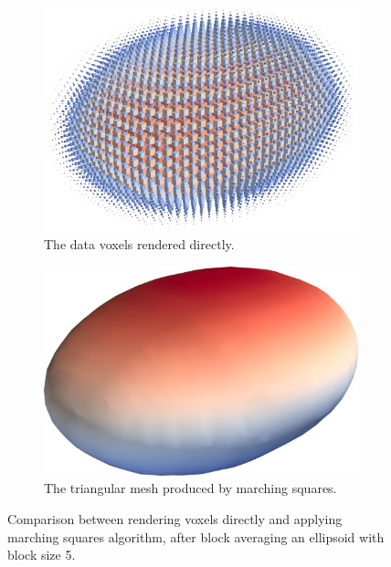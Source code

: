 \documentclass[a4paper,10pt]{report}
\begin{document}
\begin{figure}[H]
    \centering
    \begin{subfigure}{.49\textwidth}
        \includegraphics[width=\textwidth]{../images/3D/Ellipsoid_blocks_block_avg_5.png}
    \caption{The data voxels rendered directly.}
    \label{fig:Ellipsoid_blocks_block_avg_5}
    \end{subfigure}
    \hfill
    \begin{subfigure}{.49\textwidth}
        \includegraphics[width=\textwidth]{../images/3D/Ellipsoid_marching_squares_block_avg_5.png}
    \caption{The triangular mesh produced by marching squares.}
    \label{fig:Ellipsoid_marching_squares_block_avg_5}
    \end{subfigure}
    \caption{Comparison between rendering voxels directly and applying marching squares algorithm, after block averaging an ellipsoid with block size 5.}
    \label{fig:Ellipsoid_block_avg_5}
\end{figure}
\end{document}
